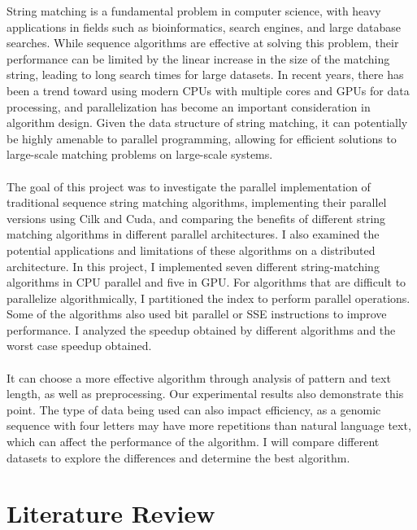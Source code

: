 \documentclass[11pt]{article}       %
\begin{document}
String matching is a fundamental problem in computer science, with heavy applications in fields such as bioinformatics, search engines, and large database searches. While sequence algorithms are effective at solving this problem, their performance can be limited by the linear increase in the size of the matching string, leading to long search times for large datasets. In recent years, there has been a trend toward using modern CPUs with multiple cores and GPUs for data processing, and parallelization has become an important consideration in algorithm design. Given the data structure of string matching, it can potentially be highly amenable to parallel programming, allowing for efficient solutions to large-scale matching problems on large-scale systems.\\
\\The goal of this project was to investigate the parallel implementation of traditional sequence string matching algorithms, implementing their parallel versions using Cilk and Cuda, and comparing the benefits of different string matching algorithms in different parallel architectures. I also examined the potential applications and limitations of these algorithms on a distributed architecture. In this project, I implemented seven different string-matching algorithms in CPU parallel and five in GPU. For algorithms that are difficult to parallelize algorithmically, I partitioned the index to perform parallel operations. Some of the algorithms also used bit parallel or SSE instructions to improve performance. I analyzed the speedup obtained by different algorithms and the worst case speedup obtained.\\ 
\\It can choose a more effective algorithm through analysis of pattern and text length, as well as preprocessing. Our experimental results also demonstrate this point. The type of data being used can also impact efficiency, as a genomic sequence with four letters may have more repetitions than natural language text, which can affect the performance of the algorithm. I will compare different datasets to explore the differences and determine the best algorithm.\\

\section{Literature Review} \label{litrev}
\end{document}
